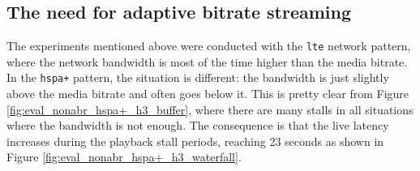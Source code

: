 \subsection{The need for adaptive bitrate streaming}
\label{sec:eval/non-abr/adaptive}

The experiments mentioned above were conducted with the \texttt{lte} network pattern, where the network bandwidth is most of the time higher than the media bitrate. In the \texttt{hspa+} pattern, the situation is different: the bandwidth is just slightly above the media bitrate and often goes below it. This is pretty clear from Figure \ref{fig:eval_nonabr_hspa+_h3_buffer}, where there are many stalls in all situations where the bandwidth is not enough. The consequence is that the live latency increases during the playback stall periods, reaching 23 seconds as shown in Figure \ref{fig:eval_nonabr_hspa+_h3_waterfall}.

